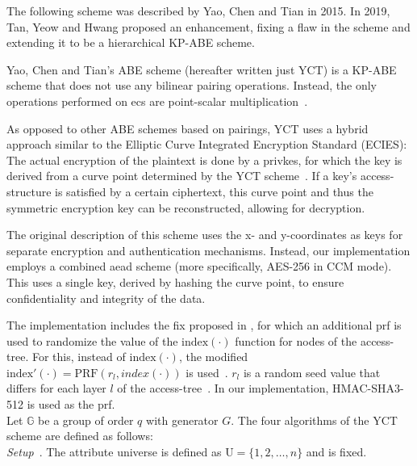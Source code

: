 The following scheme was described by Yao, Chen and Tian \cite{yao_lightweight_2015} in 2015.
In 2019, Tan, Yeow and Hwang \cite{tan_enhancement_2019} proposed an enhancement, fixing a flaw in the scheme and extending it to be a hierarchical KP-ABE scheme.

Yao, Chen and Tian's ABE scheme (hereafter written just YCT) is a KP-ABE scheme that does not use any bilinear pairing operations.
Instead, the only operations performed on \glspl{ec} are point-scalar multiplication~\cite{yao_lightweight_2015}.

As opposed to other ABE schemes based on pairings, YCT uses a hybrid approach similar to the Elliptic Curve Integrated Encryption Standard (ECIES):
The actual encryption of the plaintext is done by a \gls{privkes}, for which the key is derived from a curve point determined by the YCT scheme~\cite{yao_lightweight_2015}.
If a key's \gls{access-structure} is satisfied by a certain ciphertext, this curve point and thus the symmetric encryption key can be reconstructed, allowing for decryption.

The original description of this scheme uses the x- and y-coordinates as keys for separate encryption and authentication mechanisms.
Instead, our implementation employs a combined \acrfull{aead} scheme (more specifically, AES-256 in CCM mode).
This uses a single key, derived by hashing the curve point, to ensure confidentiality and integrity of the data.

The implementation includes the fix proposed in \cite{tan_enhancement_2019}, for which an additional \acrfull{prf} is used to randomize the value of the $\text{index}(\cdot)$ function for nodes of the \gls{access-tree}.
For this, instead of $\text{index}(\cdot)$, the modified $\text{index}'(\cdot) = \text{PRF}(r_l, index(\cdot))$ is used~\cite{tan_enhancement_2019}.
$r_l$ is a random seed value that differs for each layer $l$ of the \gls{access-tree}~\cite{tan_enhancement_2019}.
In our implementation, HMAC-SHA3-512 is used as the \acrshort{prf}.\\

Let $\mathbb{G}$ be a group of order $q$ with generator $G$. The four algorithms of the YCT scheme are defined as follows:
\\

\noindent \emph{Setup}~\cite{yao_lightweight_2015}.
The attribute universe is defined as $\text{U} = \{1, 2, \dots, n\}$ and is fixed.

